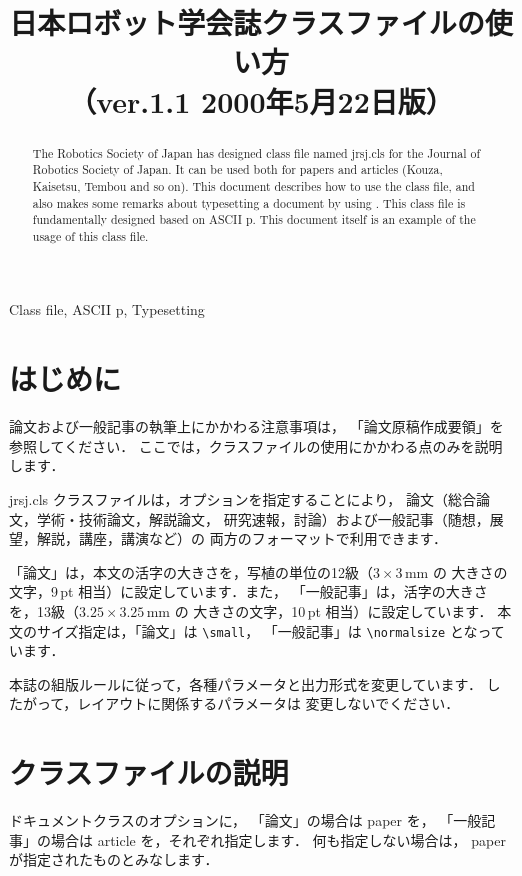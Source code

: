 \documentclass[paper]{jrsj}    %
\title[日本ロボット学会誌\LaTeXe{}クラスファイルの使い方]
      {日本ロボット学会誌\LaTeXe{}クラスファイルの使い方\\
       （ver.1.1 2000年5月22日版）}
\def\JRSJcls{{\ttfamily jrsj.cls}}
\begin{document}
\makeatletter\if@paper\makeatother
\begin{abstract}
 The Robotics Society of Japan has designed \LaTeXe{} class file
 named \JRSJcls{} for the Journal of Robotics Society of Japan. 
 It can be used both for papers and articles 
 (Kouza, Kaisetsu, Tembou and so on).
 This document describes how to use the class file, 
 and also makes some remarks about typesetting a document by using \LaTeXe{}. 
 This class file is fundamentally designed based on ASCII p\LaTeXe{}.
 This document itself is an example of the usage of this class file.
\end{abstract}
\begin{keywords}
 Class file, ASCII p\LaTeXe{}, Typesetting
\end{keywords}
\fi
\maketitle

\section{はじめに}\label{sec:prologue}

論文および一般記事の執筆上にかかわる注意事項は，
「論文原稿作成要領」を参照してください．
ここでは，クラスファイルの使用にかかわる点のみを説明します．

\JRSJcls{} クラスファイルは，オプションを指定することにより，
論文（総合論文，学術・技術論文，解説論文，
研究速報，討論）および一般記事（随想，展望，解説，講座，講演など）の
両方のフォーマットで利用できます．

「論文」は，本文の活字の大きさを，写植の単位の12級（$3 \times 3$\,mm の
大きさの文字，9\,pt 相当）に設定しています．また，
「一般記事」は，活字の大きさを，13級（$3.25 \times 3.25$\,mm の
大きさの文字，10\,pt 相当）に設定しています．
本文のサイズ指定は，「論文」は \verb/\small/，
「一般記事」は \verb/\normalsize/ となっています．

本誌の組版ルールに従って，各種パラメータと出力形式を変更しています．
したがって，レイアウトに関係するパラメータは
変更しないでください．

\section{クラスファイルの説明}

ドキュメントクラスのオプションに，
「論文」の場合は {\ttfamily paper} を，
「一般記事」の場合は {\ttfamily article} を，それぞれ指定します．
何も指定しない場合は，
{\ttfamily paper} が指定されたものとみなします．
\end{document}
